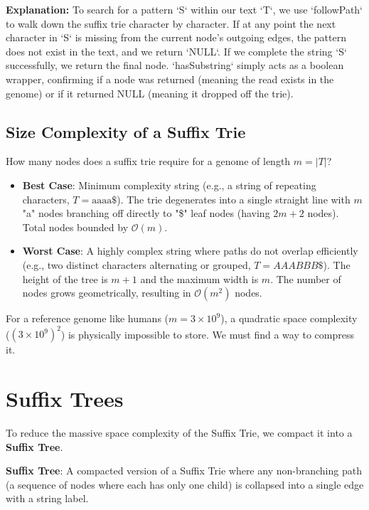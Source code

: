 \textbf{Explanation:} To search for a pattern `S` within our text `T`, we use `followPath` to walk down the suffix trie character by character. If at any point the next character in `S` is missing from the current node's outgoing edges, the pattern does not exist in the text, and we return `NULL`. If we complete the string `S` successfully, we return the final node. `hasSubstring` simply acts as a boolean wrapper, confirming if a node was returned (meaning the read exists in the genome) or if it returned NULL (meaning it dropped off the trie).

\subsection{Size Complexity of a Suffix Trie}

How many nodes does a suffix trie require for a genome of length \(m = |T|\)?
\begin{itemize}
    \item \textbf{Best Case}: Minimum complexity string (e.g., a string of repeating characters, \(T = \text{aaaa\$}\)). The trie degenerates into a single straight line with \(m\) "a" nodes branching off directly to "\$" leaf nodes (having $2m+2$ nodes). Total nodes bounded by \(\mathcal{O}(m)\).
    \item \textbf{Worst Case}: A highly complex string where paths do not overlap efficiently (e.g., two distinct characters alternating or grouped, $T = AAABBB\$$). The height of the tree is \(m+1\) and the maximum width is \(m\). The number of nodes grows geometrically, resulting in \(\mathcal{O}(m^2)\) nodes.
\end{itemize}

For a reference genome like humans (\(m = 3 \times 10^9\)), a quadratic space complexity (\( (3 \times 10^9)^2 \)) is physically impossible to store. We must find a way to compress it.

\section{Suffix Trees}

To reduce the massive space complexity of the Suffix Trie, we compact it into a \textbf{Suffix Tree}.

\begin{important}
    \textbf{Suffix Tree}: A compacted version of a Suffix Trie where any non-branching path (a sequence of nodes where each has only one child) is collapsed into a single edge with a string label.
\end{important}

